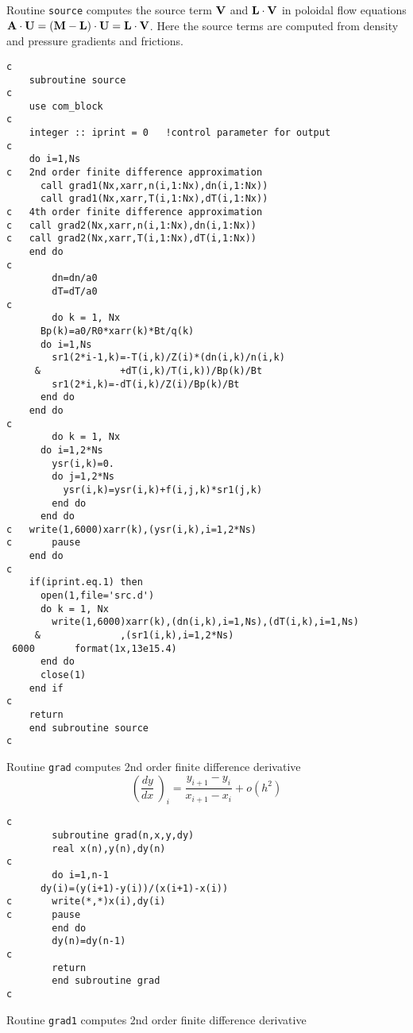 Routine {\tt source} computes the source term ${\bf V}$ and ${\bf L}\cdot{\bf V}$ in poloidal flow equations ${\bf A}\cdot{\bf U}=({\bf M}-{\bf L})\cdot{\bf U}={\bf L}\cdot{\bf V}$. Here the source terms are computed from density and pressure gradients and frictions.
\begin{verbatim}
c
	subroutine source
c
	use com_block
c
	integer :: iprint = 0   !control parameter for output
c
	do i=1,Ns
c	2nd order finite difference approximation
	  call grad1(Nx,xarr,n(i,1:Nx),dn(i,1:Nx))
	  call grad1(Nx,xarr,T(i,1:Nx),dT(i,1:Nx))
c	4th order finite difference approximation
c	call grad2(Nx,xarr,n(i,1:Nx),dn(i,1:Nx))
c	call grad2(Nx,xarr,T(i,1:Nx),dT(i,1:Nx))	
	end do
c
        dn=dn/a0
        dT=dT/a0
c
        do k = 1, Nx
	  Bp(k)=a0/R0*xarr(k)*Bt/q(k)
	  do i=1,Ns
	    sr1(2*i-1,k)=-T(i,k)/Z(i)*(dn(i,k)/n(i,k)
     &	     		+dT(i,k)/T(i,k))/Bp(k)/Bt
	    sr1(2*i,k)=-dT(i,k)/Z(i)/Bp(k)/Bt
	  end do
	end do
c	
        do k = 1, Nx                              
	  do i=1,2*Ns
	    ysr(i,k)=0.
	    do j=1,2*Ns                      
	      ysr(i,k)=ysr(i,k)+f(i,j,k)*sr1(j,k)          
	    end do                                         
	  end do
c	write(1,6000)xarr(k),(ysr(i,k),i=1,2*Ns)
c       pause
	end do                                   
c	
	if(iprint.eq.1) then
	  open(1,file='src.d')
	  do k = 1, Nx
	    write(1,6000)xarr(k),(dn(i,k),i=1,Ns),(dT(i,k),i=1,Ns)
     &	     		,(sr1(i,k),i=1,2*Ns)
 6000	    format(1x,13e15.4)
	  end do
	  close(1)
	end if
c
	return
	end subroutine source
c
\end{verbatim}
Routine {\tt grad} computes 2nd order finite difference derivative
\begin{equation}
(\frac{dy}{dx}\ )_i = \frac{y_{i+1}-y_i}{x_{i+1}-x_i}+o(h^2)
\end{equation}
\begin{verbatim}
c
        subroutine grad(n,x,y,dy)
        real x(n),y(n),dy(n)                                        
c	
        do i=1,n-1                                                  
	  dy(i)=(y(i+1)-y(i))/(x(i+1)-x(i))                           
c       write(*,*)x(i),dy(i)                                        
c       pause                                                       
        end do                                                      
        dy(n)=dy(n-1)                                               
c
        return                                                      
        end subroutine grad
c
\end{verbatim}
Routine {\tt grad1} computes 2nd order finite difference derivative
